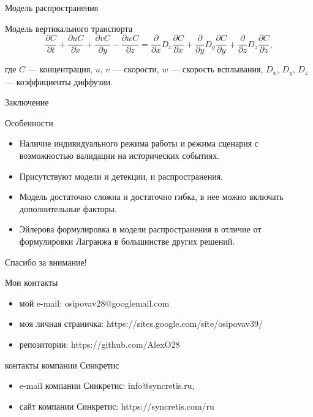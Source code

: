 \documentclass{beamer}
\begin{document}
\begin{section}{Модель распространения}
\begin{frame}{Модель вертикального транспорта}
$$\frac{\partial C}{\partial t} + \frac{\partial u C}{\partial x} + \frac{\partial v C}{\partial y} - \frac{\partial w C}{\partial z} = \frac{\partial}{\partial x}D_x\frac{\partial C}{\partial x} + \frac{\partial}{\partial y}D_y\frac{\partial C}{\partial y} + \frac{\partial}{\partial z}D_z\frac{\partial C}{\partial z},$$

где $C$ --- концентрация, $u$, $v$ --- скорости, $w$ --- скорость всплывания, $D_x$, $D_y$, $D_z$ --- коэффициенты диффузии.
\end{frame}

\end{section}

\begin{section}{Заключение}

\begin{frame}{Особенности}
	\begin{itemize}
		\item Наличие индивидуального режима работы и режима сценария с возможностью валидации на исторических событиях.
		\item Присутствуют модели и детекции, и распространения.
		\item Модель достаточно сложна и достаточно гибка, в нее можно включать дополнительные факторы.
		\item Эйлерова формулировка в модели распространения в отличие от формулировки Лагранжа в большинстве других решений.		
	\end{itemize}
\end{frame}

\end{section}

\begin{frame}{Спасибо за внимание!}

\begin{block}{Мои контакты}
\begin{itemize}
	\item мой e-mail: osipovav28@googlemail.com
	\item моя личная страничка: https://sites.google.com/site/osipovav39/
	\item репозитории: https://github.com/AlexO28
\end{itemize}
\end{block}
\begin{block}{контакты компании Синкретис}
\begin{itemize}
	\item e-mail компании Синкретис: info@syncretis.ru,
	\item сайт компании Синкретис: https://syncretis.com/ru
\end{itemize}
\end{block}

\end{frame}
\end{document}
